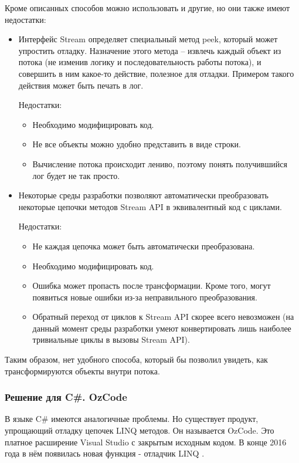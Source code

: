 Кроме описанных способов можно использовать и другие, но они также имеют недостатки:
\begin{itemize}
	\item Интерфейс Stream определяет специальный метод peek, который может упростить отладку. Назначение этого метода -- извлечь каждый объект из потока (не изменив логику и последовательность работы потока), и совершить в ним какое-то действие, полезное для отладки. Примером такого действия может быть печать в лог. 
	
	Недостатки: 
	\begin{itemize}
		\item Необходимо модифицировать код.
		\item Не все объекты можно удобно представить в виде строки.
		\item Вычисление потока происходит лениво, поэтому понять получившийся лог будет не так просто.
	\end{itemize}

	\item Некоторые среды разработки позволяют автоматически преобразовать некоторые цепочки методов Stream API в эквивалентный код с циклами. 
	
	Недостатки:
	\begin{itemize}
		\item Не каждая цепочка может быть автоматически преобразована.
		\item Необходимо модифицировать код.
		\item Ошибка может пропасть после трансформации. Кроме того, могут появиться новые ошибки из-за неправильного преобразования.
		\item Обратный переход от циклов к Stream API скорее всего невозможен (на данный момент среды разработки умеют конвертировать лишь наиболее тривиальные циклы в вызовы Stream API).
	\end{itemize}
\end{itemize}

Таким образом, нет удобного способа, который бы позволил увидеть, как трансформируются объекты внутри потока.

\subsubsection{Решение для C\#. OzCode}
В языке C\# имеются аналогичные проблемы. Но существует продукт, упрощающий отладку цепочек LINQ методов. Он называется OzCode. Это платное расширение Visual Studio \cite{ms:vs} с закрытым исходным кодом. В конце 2016 года в нём появилась новая функция - отладчик LINQ \cite{ms:ozcode}.

